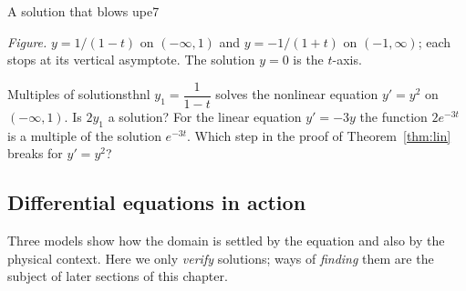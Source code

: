 \documentclass[11pt]{article}
\begin{document}
\begin{exmp}{A solution that blows up}{e7}
\begin{center}
\par\small\emph{Figure.} $y=1/(1-t)$ on $(-\infty,1)$ and $y=-1/(1+t)$ on $(-1,\infty)$; each stops at its vertical asymptote. The solution $y=0$ is the $t$-axis.
\end{center}
\end{exmp}

\begin{think}{Multiples of solutions}{thnl}
$y_1=\dfrac1{1-t}$ solves the nonlinear equation $y'=y^2$ on $(-\infty,1)$. Is $2y_1$ a solution? For the linear equation $y'=-3y$ the function $2e^{-3t}$ is a multiple of the solution $e^{-3t}$. Which step in the proof of Theorem~\ref{thm:lin} breaks for $y'=y^2$?
\end{think}

\subsection*{Differential equations in action}

Three models show how the domain is settled by the equation and also by the physical context. Here we only \emph{verify} solutions; ways of \emph{finding} them are the subject of later sections of this chapter.
\end{document}
